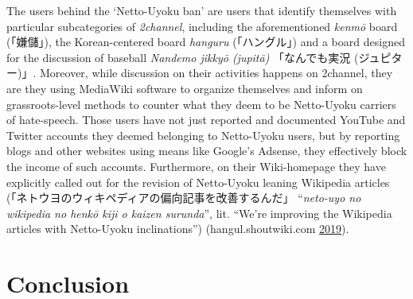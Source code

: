 \documentclass[10pt,british,A4paper,,openany]{memoir}
\begin{document}
The users behind the `Netto-Uyoku ban' are users that identify
themselves with particular subcategories of \emph{2channel}, including
the aforementioned \emph{kenmō} board (「嫌儲」), the Korean-centered
board \emph{hanguru} (「ハングル」) and a board designed for the
discussion of baseball \emph{Nandemo jikkyō (jupitā)} 「なんでも実況
(ジュピター)」. Moreover, while discussion on their activities happens
on 2channel, they are they using MediaWiki software to organize
themselves and inform on grassroots-level methods to counter what they
deem to be Netto-Uyoku carriers of hate-speech. Those users have not
just reported and documented YouTube and Twitter accounts they deemed
belonging to Netto-Uyoku users, but by reporting blogs and other
websites using means like Google's Adsense, they effectively block the
income of such accounts. Furthermore, on their Wiki-homepage they have
explicitly called out for the revision of Netto-Uyoku leaning Wikipedia
articles (「ネトウヨのウィキペディアの偏向記事を改善するんだ」
``\emph{neto-uyo no wikipedia no henkō kiji o kaizen surunda}'', lit.
``We're improving the Wikipedia articles with Netto-Uyoku
inclinations'') (hangul.shoutwiki.com
\protect\hyperlink{ref-hangul.shoutwiki.com_wikipedia_2019}{2019}).

\section{Conclusion}\label{conclusion-2}
\end{document}
